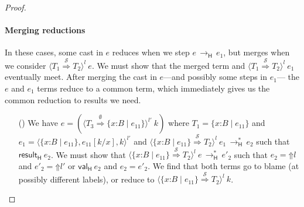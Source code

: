 \documentclass[9pt]{extarticle}
\newcommand{\ottnt}[1]{\mathit{#1}}
\newcommand{\ottsym}[1]{#1}
\begin{document}
{\begin{lemma}
\begin{proof}
{    \paragraph{Merging reductions}
In these cases, some cast in $\ottnt{e}$ reduces when we step $\ottnt{e} \,  \longrightarrow _{  \mathsf{H}  }  \, \ottnt{e_{{\mathrm{1}}}}$, but merges when we consider $ \langle  \ottnt{T_{{\mathrm{1}}}}  \mathord{ \overset{ \mathcal{S} }{\Rightarrow} }  \ottnt{T_{{\mathrm{2}}}}  \rangle^{ \ottnt{l} } ~  \ottnt{e} $. We
    must show that the merged term and $ \langle  \ottnt{T_{{\mathrm{1}}}}  \mathord{ \overset{ \mathcal{S} }{\Rightarrow} }  \ottnt{T_{{\mathrm{2}}}}  \rangle^{ \ottnt{l} } ~  \ottnt{e_{{\mathrm{1}}}} $
    eventually meet. After merging the cast in $\ottnt{e}$---and possibly
    some steps in $\ottnt{e_{{\mathrm{1}}}}$--- the $\ottnt{e}$ and $\ottnt{e_{{\mathrm{1}}}}$ terms 
    reduce to a common term, which immediately gives us the common
    reduction to results we need.
\begin{itemize}
    \item[(\E{CheckEmpty})] We have $\ottnt{e}  \ottsym{=}   (  \langle  \ottnt{T_{{\mathrm{3}}}}  \mathord{ \overset{ \emptyset }{\Rightarrow} }   \{ \mathit{x} \mathord{:} \ottnt{B} \mathrel{\mid} \ottnt{e_{{\mathrm{11}}}} \}   \rangle^{ \ottnt{l'} } ~  \ottnt{k}  ) $ where $\ottnt{T_{{\mathrm{1}}}}  \ottsym{=}   \{ \mathit{x} \mathord{:} \ottnt{B} \mathrel{\mid} \ottnt{e_{{\mathrm{11}}}} \} $ and $\ottnt{e_{{\mathrm{1}}}}  \ottsym{=}   \langle   \{ \mathit{x} \mathord{:} \ottnt{B} \mathrel{\mid} \ottnt{e_{{\mathrm{11}}}} \}  ,   \ottnt{e_{{\mathrm{11}}}}  [  \ottnt{k} / \mathit{x}  ]  ,  \ottnt{k}  \rangle^{ \ottnt{l'} } $ and $ \langle   \{ \mathit{x} \mathord{:} \ottnt{B} \mathrel{\mid} \ottnt{e_{{\mathrm{11}}}} \}   \mathord{ \overset{ \mathcal{S} }{\Rightarrow} }  \ottnt{T_{{\mathrm{2}}}}  \rangle^{ \ottnt{l} } ~  \ottnt{e_{{\mathrm{1}}}}  \,  \longrightarrow ^{*}_{  \mathsf{H}  }  \, \ottnt{e_{{\mathrm{2}}}}$ such that $ \mathsf{result} _{  \mathsf{H}  }~ \ottnt{e_{{\mathrm{2}}}} $. We must show that
      $ \langle   \{ \mathit{x} \mathord{:} \ottnt{B} \mathrel{\mid} \ottnt{e_{{\mathrm{11}}}} \}   \mathord{ \overset{ \mathcal{S} }{\Rightarrow} }  \ottnt{T_{{\mathrm{2}}}}  \rangle^{ \ottnt{l} } ~  \ottnt{e}  \,  \longrightarrow ^{*}_{  \mathsf{H}  }  \, \ottnt{e'_{{\mathrm{2}}}}$ such that $\ottnt{e_{{\mathrm{2}}}}  \ottsym{=}   \mathord{\Uparrow}  \ottnt{l} $ and $\ottnt{e'_{{\mathrm{2}}}}  \ottsym{=}   \mathord{\Uparrow}  \ottnt{l'} $ or $ \mathsf{val} _{  \mathsf{H}  }~ \ottnt{e_{{\mathrm{2}}}} $ and
      $\ottnt{e_{{\mathrm{2}}}}  \ottsym{=}  \ottnt{e'_{{\mathrm{2}}}}$.
We find that both terms go to blame (at possibly different
      labels), or reduce to $ \langle   \{ \mathit{x} \mathord{:} \ottnt{B} \mathrel{\mid} \ottnt{e_{{\mathrm{11}}}} \}   \mathord{ \overset{ \mathcal{S} }{\Rightarrow} }  \ottnt{T_{{\mathrm{2}}}}  \rangle^{ \ottnt{l} } ~  \ottnt{k} $.
      

\end{itemize}}
\end{proof}
\end{lemma}}
\end{document}
